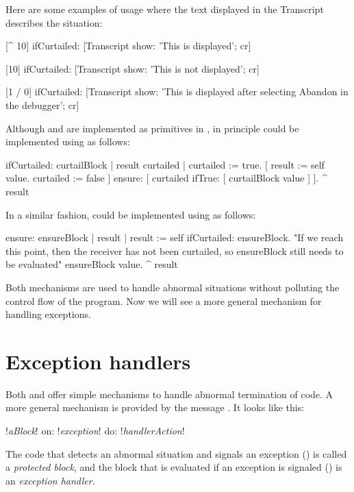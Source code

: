 \documentclass[a4paper,10pt,twoside]{book}
\begin{document}
Here are some  examples of  usage where the text displayed in the Transcript describes the situation:

\begin{code}{}
[^ 10] ifCurtailed: [Transcript show: 'This is displayed'; cr] 

[10] ifCurtailed: [Transcript show: 'This is not displayed'; cr] 

[1 / 0] ifCurtailed: [Transcript show: 'This is displayed after selecting Abandon in the debugger'; cr]
\end{code}

Although  and  are implemented as primitives in \pharo, in principle  could be implemented using  as follows:

\begin{code}{}
ifCurtailed: curtailBlock
	| result curtailed |
	curtailed := true.
	[	result := self value.
		curtailed := false
	]	ensure: [ curtailed ifTrue: [ curtailBlock value ] ].
	^ result
\end{code}

In a similar fashion,  could be implemented using  as follows:

\begin{code}{}
ensure: ensureBlock
	| result |
	result := self ifCurtailed: ensureBlock.
	"If we reach this point, then the receiver has not been curtailed,
	so ensureBlock still needs to be evaluated"
	ensureBlock value.
	^ result
\end{code}

Both mechanisms are used to handle abnormal situations without polluting the control flow of the program.
Now we will see a more general mechanism for handling exceptions.

\section{Exception handlers}

Both  and  offer simple mechanisms to handle abnormal termination of code. A more general mechanism is provided by the message . It looks like this:
\begin{code}{}
!\emph{aBlock}! on: !\emph{exception}! do: !\emph{handlerAction}!
\end{code}
\noindent
The code that detects an abnormal situation and signals an exception () is called a \emph{protected block}, and the block that is evaluated if an exception is signaled () is  an \emph{exception handler}.
\end{document}

